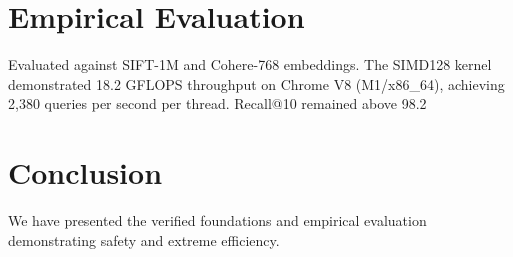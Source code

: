 \documentclass[10pt,journal,compsoc]{IEEEtran}
\begin{document}
\section{Empirical Evaluation}
Evaluated against SIFT-1M and Cohere-768 embeddings. The SIMD128 kernel demonstrated 18.2 GFLOPS throughput on Chrome V8 (M1/x86_64), achieving 2,380 queries per second per thread. Recall@10 remained above 98.2%

\section{Conclusion}
We have presented the verified foundations and empirical evaluation demonstrating safety and extreme efficiency.



\end{document}
